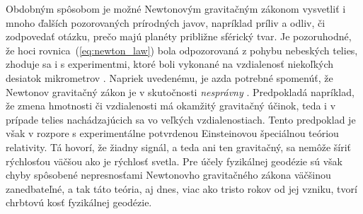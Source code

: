 \documentclass[a4paper, 12pt]{book}
\begin{document}
%


Obdobným spôsobom je možné Newtonovým gravitačným zákonom vysvetliť i mnoho 
ďalších pozorovaných prírodných javov, napríklad príliv a odliv, či zodpovedať 
otázku, prečo majú planéty približne sférický tvar.  Je pozoruhodné, že hoci 
rovnica~(\ref{eq:newton_law}) bola odpozorovaná z pohybu nebeských telies, 
zhoduje sa i s experimentmi, ktoré boli vykonané na vzdialenosť niekoľkých 
desiatok mikrometrov \citep{Lee2020}.  Napriek uvedenému, je azda potrebné 
spomenúť, že Newtonov gravitačný zákon je v skutočnosti \emph{nesprávny} 
\citep{Feynman}.  Predpokladá napríklad, že zmena hmotnosti či vzdialenosti má 
okamžitý gravitačný účinok, teda i v prípade telies nachádzajúcich sa vo 
veľkých vzdialenostiach.  Tento predpoklad je však v rozpore s experimentálne 
potvrdenou Einsteinovou špeciálnou teóriou relativity.  Tá hovorí, že žiadny 
signál, a teda ani ten gravitačný, sa nemôže šíriť rýchlosťou väčšou ako je 
rýchlosť svetla.  Pre účely fyzikálnej geodézie sú však chyby spôsobené 
nepresnosťami Newtonovho gravitačného zákona väčšinou zanedbateľné, a tak táto 
teória, aj dnes, viac ako tristo rokov od jej vzniku, tvorí chrbtovú kosť 
fyzikálnej geodézie.
\end{document}
